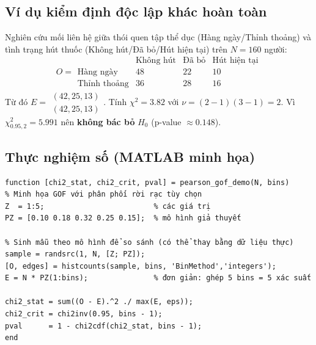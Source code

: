 \subsection{Ví dụ kiểm định độc lập khác hoàn toàn}
Nghiên cứu mối liên hệ giữa thói quen tập thể dục (Hàng ngày/Thỉnh thoảng) và tình trạng hút thuốc (Không hút/Đã bỏ/Hút hiện tại) trên $N=160$ người:
\[
O=\begin{array}{c|ccc}
 & \text{Không hút} & \text{Đã bỏ} & \text{Hút hiện tại}\\\hline
\text{Hàng ngày} & 48 & 22 & 10\\
\text{Thỉnh thoảng} & 36 & 28 & 16
\end{array}
\]
Từ đó $E=\begin{smallmatrix}(42,25,13)\\(42,25,13)\end{smallmatrix}$. Tính $\chi^2=3.82$ với $\nu=(2-1)(3-1)=2$. Vì $\chi^2_{0.95,2}=5.991$ nên \textbf{không bác bỏ} $H_0$ (p-value $\approx0.148$).

\subsection{Thực nghiệm số (MATLAB minh họa)}
\begin{matlab}
\begin{lstlisting}
function [chi2_stat, chi2_crit, pval] = pearson_gof_demo(N, bins)
% Minh họa GOF với phân phối rời rạc tùy chọn
Z  = 1:5;                         % các giá trị
PZ = [0.10 0.18 0.32 0.25 0.15];  % mô hình giả thuyết

% Sinh mẫu theo mô hình để so sánh (có thể thay bằng dữ liệu thực)
sample = randsrc(1, N, [Z; PZ]);
[O, edges] = histcounts(sample, bins, 'BinMethod','integers');
E = N * PZ(1:bins);               % đơn giản: ghép 5 bins = 5 xác suất

chi2_stat = sum((O - E).^2 ./ max(E, eps));
chi2_crit = chi2inv(0.95, bins - 1);
pval      = 1 - chi2cdf(chi2_stat, bins - 1);
end
\end{lstlisting}
\end{matlab}

